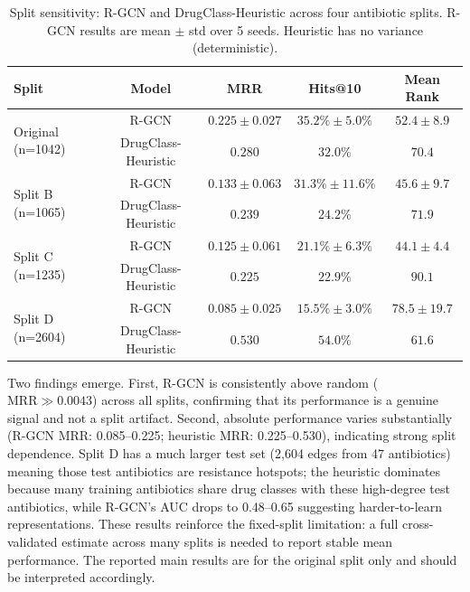 \documentclass[conference]{IEEEtran}
\begin{document}
\begin{table}[h]
\centering
\caption{Split sensitivity: R-GCN and DrugClass-Heuristic across four antibiotic splits. R-GCN results are mean $\pm$ std over 5 seeds. Heuristic has no variance (deterministic).}
\label{tab:sensitivity}
\begin{tabular}{lcccc}
\toprule
\textbf{Split} & \textbf{Model} & \textbf{MRR} & \textbf{Hits@10} & \textbf{Mean Rank} \\
\midrule
\multirow{2}{*}{Original (n=1042)}
  & R-GCN             & $0.225 \pm 0.027$ & $35.2\% \pm 5.0\%$ & $52.4 \pm 8.9$ \\
  & DrugClass-Heuristic & $0.280$           & $32.0\%$           & $70.4$ \\
\midrule
\multirow{2}{*}{Split B (n=1065)}
  & R-GCN             & $0.133 \pm 0.063$ & $31.3\% \pm 11.6\%$ & $45.6 \pm 9.7$ \\
  & DrugClass-Heuristic & $0.239$           & $24.2\%$             & $71.9$ \\
\midrule
\multirow{2}{*}{Split C (n=1235)}
  & R-GCN             & $0.125 \pm 0.061$ & $21.1\% \pm 6.3\%$ & $44.1 \pm 4.4$ \\
  & DrugClass-Heuristic & $0.225$           & $22.9\%$           & $90.1$ \\
\midrule
\multirow{2}{*}{Split D (n=2604)}
  & R-GCN             & $0.085 \pm 0.025$ & $15.5\% \pm 3.0\%$ & $78.5 \pm 19.7$ \\
  & DrugClass-Heuristic & $0.530$           & $54.0\%$           & $61.6$ \\
\bottomrule
\end{tabular}
\end{table}

Two findings emerge. First, R-GCN is consistently above random ($\text{MRR} \gg 0.0043$) across all splits, confirming that its performance is a genuine signal and not a split artifact. Second, absolute performance varies substantially (R-GCN MRR: 0.085--0.225; heuristic MRR: 0.225--0.530), indicating strong split dependence. Split D has a much larger test set (2,604 edges from 47 antibiotics) meaning those test antibiotics are resistance hotspots; the heuristic dominates because many training antibiotics share drug classes with these high-degree test antibiotics, while R-GCN's AUC drops to 0.48--0.65 suggesting harder-to-learn representations. These results reinforce the fixed-split limitation: a full cross-validated estimate across many splits is needed to report stable mean performance. The reported main results are for the original split only and should be interpreted accordingly.
\end{document}
